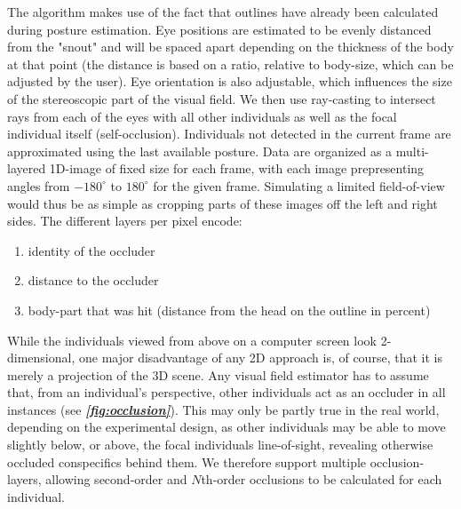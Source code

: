 \documentclass[9pt,lineno]{elife}
\newcommand{\figref}[1]{\textit{\textbf{\ref{#1}}}}
\begin{document}
The algorithm makes use of the fact that outlines have already been calculated during posture estimation. Eye positions are estimated to be evenly distanced from the "snout" and will be spaced apart depending on the thickness of the body at that point (the distance is based on a ratio, relative to body-size, which can be adjusted by the user). Eye orientation is also adjustable, which influences the size of the stereoscopic part of the visual field. We then use ray-casting to intersect rays from each of the eyes with all other individuals as well as the focal individual itself (self-occlusion). Individuals not detected in the current frame are approximated using the last available posture. Data are organized as a multi-layered 1D-image of fixed size for each frame, with each image prepresenting angles from $-180^{\circ}$ to $180^{\circ}$ for the given frame. Simulating a limited field-of-view would thus be as simple as cropping parts of these images off the left and right sides. The different layers per pixel encode:

\begin{enumerate}
	\item identity of the occluder
	\item distance to the occluder
	\item body-part that was hit (distance from the head on the outline in percent)
\end{enumerate}

While the individuals viewed from above on a computer screen look 2-dimensional, one major disadvantage of any 2D approach is, of course, that it is merely a projection of the 3D scene. Any visual field estimator has to assume that, from an individual's perspective, other individuals act as an occluder in all instances (see \figref{fig:occlusion}). This may only be partly true in the real world, depending on the experimental design, as other individuals may be able to move slightly below, or above, the focal individuals line-of-sight, revealing otherwise occluded conspecifics behind them. We therefore support multiple occlusion-layers, allowing second-order and $N$th-order occlusions to be calculated for each individual. %

\end{document}
